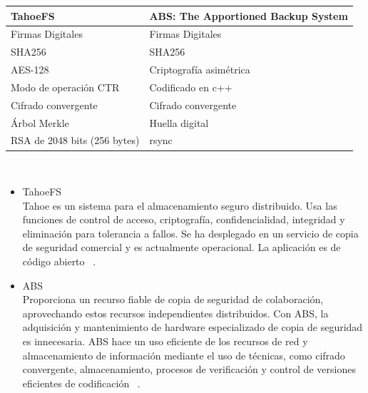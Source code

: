 \begin{tabular}{ |p{8cm}|p{8cm}| }
\hline
{ \textbf{TahoeFS}} & {\textbf{ABS: The Apportioned Backup System} } \\
\hline
{Firmas Digitales} & {Firmas Digitales} \\
\hline
{SHA256} & {SHA256} \\
\hline
{AES-128} & {Criptografía asimétrica} \\
\hline
{Modo de operación CTR } & {Codificado en c++} \\
\hline
{Cifrado convergente} & {Cifrado convergente} \\
\hline
{Árbol Merkle} & {Huella digital} \\
\hline
{RSA de 2048 bits (256 bytes) } & { rsync } \\
\hline
\end{tabular}
\\
\begin{itemize}
\item TahoeFS\\
Tahoe es un sistema para el almacenamiento seguro distribuido. Usa las funciones de control de acceso, criptografía, confidencialidad, integridad y eliminación para tolerancia a fallos. Se ha desplegado en un servicio de copia de seguridad comercial y es actualmente operacional. La aplicación es de código abierto ~\cite{tahoe}.
\item ABS\\
Proporciona un recurso fiable de copia de seguridad de colaboración, aprovechando estos recursos independientes distribuidos. Con ABS, la adquisición y mantenimiento de hardware especializado de copia de seguridad es innecesaria. ABS hace un uso eficiente de los recursos de red y almacenamiento de información mediante el uso de técnicas, como cifrado convergente, almacenamiento, procesos de verificación y control de versiones eficientes de codificación ~\cite{abs}.
\end{itemize}
